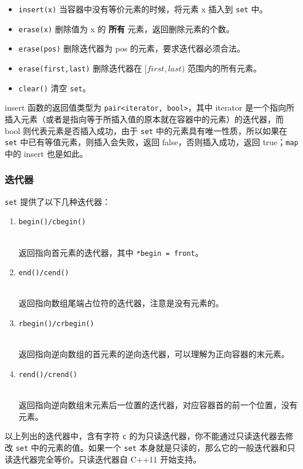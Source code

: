 \begin{itemize}
\tightlist
\item
  \texttt{insert(x)} 当容器中没有等价元素的时候，将元素 x 插入到 \texttt{set} 中。
\item
  \texttt{erase(x)} 删除值为 x 的 \textbf{所有} 元素，返回删除元素的个数。
\item
  \texttt{erase(pos)} 删除迭代器为 pos 的元素，要求迭代器必须合法。
\item
  \texttt{erase(first,last)} 删除迭代器在 \([first,last)\) 范围内的所有元素。
\item
  \texttt{clear()} 清空 \texttt{set}。
\end{itemize}

insert 函数的返回值类型为 \texttt{pair\textless{}iterator,\ bool\textgreater{}}，其中 iterator 是一个指向所插入元素（或者是指向等于所插入值的原本就在容器中的元素）的迭代器，而 bool 则代表元素是否插入成功，由于 \texttt{set} 中的元素具有唯一性质，所以如果在 \texttt{set} 中已有等值元素，则插入会失败，返回 false，否则插入成功，返回 true；\texttt{map} 中的 insert 也是如此。

\subsubsection{迭代器}\label{ux8fedux4ee3ux5668-1}

\texttt{set} 提供了以下几种迭代器：

\begin{enumerate}
\def\labelenumi{\arabic{enumi}.}
\tightlist
\item
  \texttt{begin()/cbegin()}\strut \\
  返回指向首元素的迭代器，其中 \texttt{*begin\ =\ front}。
\item
  \texttt{end()/cend()}\strut \\
  返回指向数组尾端占位符的迭代器，注意是没有元素的。
\item
  \texttt{rbegin()/crbegin()}\strut \\
  返回指向逆向数组的首元素的逆向迭代器，可以理解为正向容器的末元素。
\item
  \texttt{rend()/crend()}\strut \\
  返回指向逆向数组末元素后一位置的迭代器，对应容器首的前一个位置，没有元素。
\end{enumerate}

以上列出的迭代器中，含有字符 \texttt{c} 的为只读迭代器，你不能通过只读迭代器去修改 \texttt{set} 中的元素的值。如果一个 \texttt{set} 本身就是只读的，那么它的一般迭代器和只读迭代器完全等价。只读迭代器自 C++11 开始支持。


